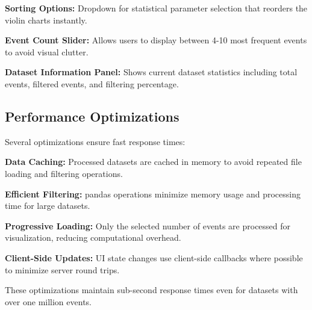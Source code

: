 \textbf{Sorting Options:} Dropdown for statistical parameter selection that reorders the violin charts instantly.

\textbf{Event Count Slider:} Allows users to display between 4-10 most frequent events to avoid visual clutter.

\textbf{Dataset Information Panel:} Shows current dataset statistics including total events, filtered events, and filtering percentage.

\subsection{Performance Optimizations}
\label{subsec:performance}

Several optimizations ensure fast response times:

\textbf{Data Caching:} Processed datasets are cached in memory to avoid repeated file loading and filtering operations.

\textbf{Efficient Filtering:} pandas operations minimize memory usage and processing time for large datasets.

\textbf{Progressive Loading:} Only the selected number of events are processed for visualization, reducing computational overhead.

\textbf{Client-Side Updates:} UI state changes use client-side callbacks where possible to minimize server round trips.

These optimizations maintain sub-second response times even for datasets with over one million events.
